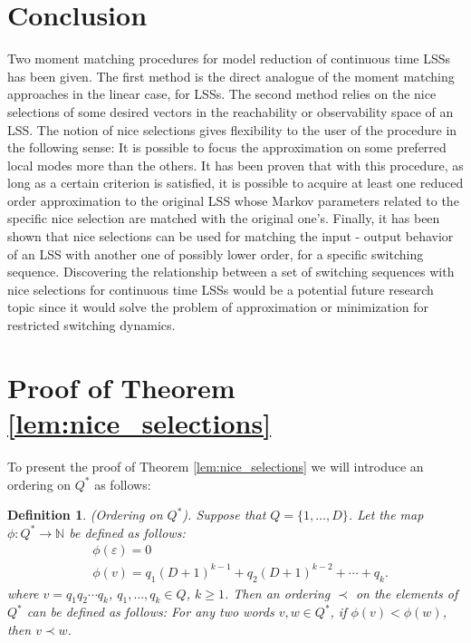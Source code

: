 \documentclass[journal]{IEEEtran}
\newtheorem{Definition}{Definition}
\begin{document}
\section{Conclusion}
\label{sec:conc}

Two moment matching procedures for model reduction of continuous time LSSs has been given. The first method is the direct analogue of the moment matching approaches in the linear case, for LSSs. The second method relies on the nice selections of some desired vectors in the reachability or observability space of an LSS. The notion of nice selections gives flexibility to the user of the procedure in the following sense: It is possible to focus the approximation on some preferred local modes more than the others. It has been proven that with this procedure, as long as a certain criterion is satisfied, it is possible to acquire at least one reduced order approximation to the original LSS whose Markov parameters related to the specific nice selection are matched with the original one's. Finally, it has been shown that nice selections can be used for matching the input - output behavior of an LSS with another one of possibly lower order, for a specific switching sequence. Discovering the relationship between a set of switching sequences with nice selections for continuous time LSSs would be a potential future research topic since it would solve the problem of approximation or minimization for restricted switching dynamics.







\appendices

\section{Proof of Theorem \ref{lem:nice_selections}}
To present the proof of Theorem \ref{lem:nice_selections} we will introduce an ordering on $Q^*$ as follows:

\begin{Definition} \label{def:lexico}
	\emph{(Ordering on $Q^*$).} Suppose that $Q=\{1,\dots,D\}$. Let the map $\phi: Q^* \rightarrow \mathbb{N}$ be defined as follows:
	\begin{equation}
		\begin{aligned}
			& \phi(\varepsilon)=0 \\
			& \phi(v)=q_1(D+1)^{k-1}+q_2(D+1)^{k-2} + \cdots +q_k.
		\end{aligned}
	\end{equation}
	where $v = q_1q_2 \cdots q_k$, $q_1, \dots, q_k \in Q$, $k \geq 1$.
	Then an \emph{ordering} $\prec$ on the elements of $Q^*$ can be defined as follows: For any two words $v,w \in Q^*$, if $\phi(v) < \phi(w)$, then $v \prec w$. 
\end{Definition}
\end{document}
